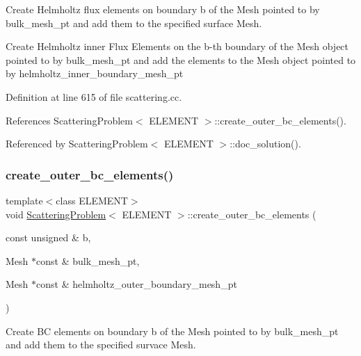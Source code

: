 Create Helmholtz flux elements on boundary b of the Mesh pointed to by bulk\+\_\+mesh\+\_\+pt and add them to the specified surface Mesh. 

Create Helmholtz inner Flux Elements on the b-\/th boundary of the Mesh object pointed to by bulk\+\_\+mesh\+\_\+pt and add the elements to the Mesh object pointed to by helmholtz\+\_\+inner\+\_\+boundary\+\_\+mesh\+\_\+pt 

Definition at line 615 of file scattering.\+cc.



References Scattering\+Problem$<$ E\+L\+E\+M\+E\+N\+T $>$\+::create\+\_\+outer\+\_\+bc\+\_\+elements().



Referenced by Scattering\+Problem$<$ E\+L\+E\+M\+E\+N\+T $>$\+::doc\+\_\+solution().

\mbox{\label{classScatteringProblem_a408e05fbe1f1456ab7013a7e8ab29ccc}} 
\subsubsection{\texorpdfstring{create\+\_\+outer\+\_\+bc\+\_\+elements()}{create\_outer\_bc\_elements()}\hspace{0.1cm}{\footnotesize\ttfamily [1/2]}}
{\footnotesize\ttfamily template$<$class E\+L\+E\+M\+E\+NT$>$ \\
void \hyperlink{classScatteringProblem}{Scattering\+Problem}$<$ E\+L\+E\+M\+E\+NT $>$\+::create\+\_\+outer\+\_\+bc\+\_\+elements (\begin{DoxyParamCaption}\item[{const unsigned \&}]{b,  }\item[{Mesh $\ast$const \&}]{bulk\+\_\+mesh\+\_\+pt,  }\item[{Mesh $\ast$const \&}]{helmholtz\+\_\+outer\+\_\+boundary\+\_\+mesh\+\_\+pt }\end{DoxyParamCaption})}



Create BC elements on boundary b of the Mesh pointed to by bulk\+\_\+mesh\+\_\+pt and add them to the specified survace Mesh. 

\mbox{\label{classScatteringProblem_a408e05fbe1f1456ab7013a7e8ab29ccc}} 
